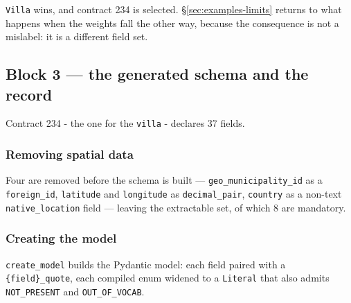 \texttt{Villa} wins, and contract 234 is selected. \S\ref{sec:examples-limits} returns to what happens when the weights fall the other way, because the consequence is not a mislabel: it is a different field set.

\subsection{Block 3 --- the generated schema and the record}
\label{sec:examples-block3-run}

Contract 234 - the one for the \texttt{villa} - declares 37 fields. 

\subsubsection{Removing spatial data}
Four are removed before the schema is built --- \texttt{geo\_municipality\_id} as a \texttt{foreign\_id}, \texttt{latitude} and \texttt{longitude} as \texttt{decimal\_pair}, \texttt{country} as a non-text \texttt{native\_location} field --- leaving the extractable set, of which 8 are mandatory. 

\subsubsection{Creating the model}
\texttt{create\_model} builds the Pydantic model: each field paired with a \texttt{\{field\}\_quote}, each compiled enum widened to a \texttt{Literal} that also admits \texttt{NOT\_PRESENT} and \texttt{OUT\_OF\_VOCAB}.


